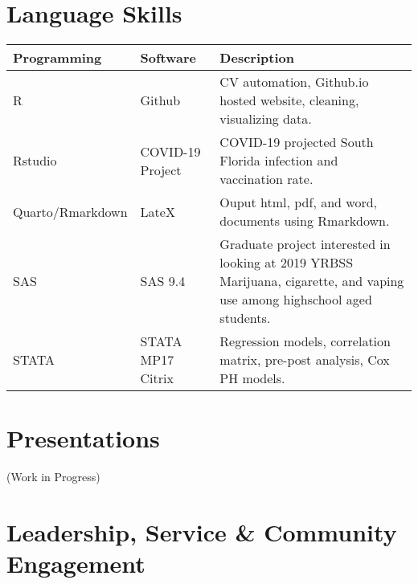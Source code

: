 \documentclass[11pt,a4paper,]{awesome-cv}
\begin{document}
\hypertarget{language-skills}{%
\section{Language Skills}\label{language-skills}}

\begin{table}[!h]
\centering
\begin{tabular}{ll>{\raggedright\arraybackslash}p{27em}}
\toprule
Programming & Software & Description\\
\midrule
R & Github & CV automation, Github.io hosted website, cleaning, visualizing data.\\
Rstudio & COVID-19 Project & COVID-19 projected South Florida infection and vaccination rate.\\
Quarto/Rmarkdown & LateX & Ouput html, pdf, and word, documents using Rmarkdown.\\
SAS & SAS 9.4 & Graduate project interested in looking at 2019 YRBSS Marijuana, cigarette, and vaping use among highschool aged students.\\
STATA & STATA MP17 Citrix & Regression models, correlation matrix, pre-post analysis, Cox PH models.\\
\bottomrule
\end{tabular}
\end{table}

\hypertarget{presentations}{%
\section{Presentations}\label{presentations}}

(Work in Progress)

\hypertarget{leadership-service-community-engagement}{%
\section{Leadership, Service \& Community
Engagement}\label{leadership-service-community-engagement}}
\end{document}
